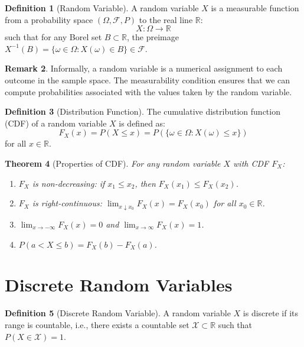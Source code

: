 \documentclass[12pt,a4paper]{article}
\theoremstyle{plain}
\newtheorem{theorem}{Theorem}[section]
\theoremstyle{definition}
\newtheorem{definition}[theorem]{Definition}
\newtheorem{remark}[theorem]{Remark}
\begin{document}
\begin{definition}[Random Variable]
A random variable $X$ is a measurable function from a probability space $(\Omega, \mathcal{F}, P)$ to the real line $\mathbb{R}$:
\begin{equation}
X: \Omega \rightarrow \mathbb{R}
\end{equation}
such that for any Borel set $B \subset \mathbb{R}$, the preimage $X^{-1}(B) = \{\omega \in \Omega : X(\omega) \in B\} \in \mathcal{F}$.
\end{definition}

\begin{remark}
Informally, a random variable is a numerical assignment to each outcome in the sample space. The measurability condition ensures that we can compute probabilities associated with the values taken by the random variable.
\end{remark}

\begin{definition}[Distribution Function]
The cumulative distribution function (CDF) of a random variable $X$ is defined as:
\begin{equation}
F_X(x) = P(X \leq x) = P(\{\omega \in \Omega : X(\omega) \leq x\})
\end{equation}
for all $x \in \mathbb{R}$.
\end{definition}

\begin{theorem}[Properties of CDF]
For any random variable $X$ with CDF $F_X$:
\begin{enumerate}[label=(\roman*)]
\item $F_X$ is non-decreasing: if $x_1 \leq x_2$, then $F_X(x_1) \leq F_X(x_2)$.
\item $F_X$ is right-continuous: $\lim_{x \downarrow x_0} F_X(x) = F_X(x_0)$ for all $x_0 \in \mathbb{R}$.
\item $\lim_{x \rightarrow -\infty} F_X(x) = 0$ and $\lim_{x \rightarrow \infty} F_X(x) = 1$.
\item $P(a < X \leq b) = F_X(b) - F_X(a)$.
\end{enumerate}
\end{theorem}

\section{Discrete Random Variables}

\begin{definition}[Discrete Random Variable]
A random variable $X$ is discrete if its range is countable, i.e., there exists a countable set $\mathcal{X} \subset \mathbb{R}$ such that $P(X \in \mathcal{X}) = 1$.
\end{definition}
\end{document}

